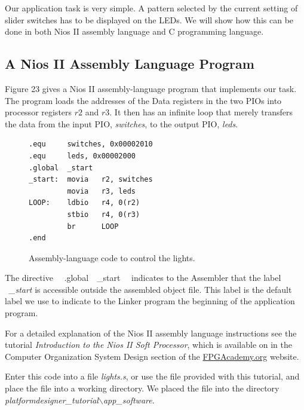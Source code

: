 \documentclass[11pt, twoside, pdftex]{article}
\begin{document}
Our application task is very simple. A pattern selected by the current setting of slider 
switches has to be displayed on the LEDs. We will show how this can be done in both
Nios II assembly language and C programming language.

\subsection{A Nios II Assembly Language Program}
Figure 23 gives a Nios II assembly-language program that implements our task. 
The program loads the addresses of the Data registers in the two PIOs
into processor registers $r2$ and $r3$. It then has an infinite loop that merely
transfers the data from the input PIO, {\it switches}, to the output PIO, {\it leds}.

\begin{figure}[H]
\begin{center}
\begin{lstlisting}[style=defaultNiosStyle, xleftmargin=4cm]
.equ     switches, 0x00002010
.equ     leds, 0x00002000
.global  _start
_start:  movia   r2, switches
         movia   r3, leds
LOOP:    ldbio   r4, 0(r2)
         stbio   r4, 0(r3)
         br      LOOP
.end
\end{lstlisting}
\end{center}
	\caption{Assembly-language code to control the lights.}
	\label{fig:24}
\end{figure}

The directive ~~.global~~\_start ~~indicates
to the Assembler that the label  ~{\it \_start} is accessible outside the
assembled object file. This label is the default label we use to indicate to
the Linker program the beginning of the application program.

For a detailed explanation of the Nios II assembly language instructions see
the tutorial {\it Introduction to the Nios II Soft Processor},
which is available on in the Computer Organization System Design section of the
{\small \href{https://www.fpgacademy.org/tutorials.html} {FPGAcademy.org}} website.

Enter this code into a file {\it lights.s}, or use the file provided with this tutorial,
and place the file into a working directory. We placed the file into the directory 
{\it platformdesigner\_tutorial$\backslash$app\_software}.
\end{document}
